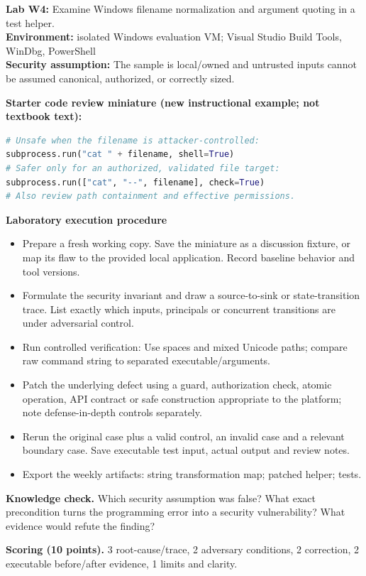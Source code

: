 \documentclass[10pt,letterpaper]{article}
\begin{document}
\begin{insight}\textbf{Lab W4:} Examine Windows filename normalization and argument quoting in a test helper.\\\textbf{Environment:} isolated Windows evaluation VM; Visual Studio Build Tools, WinDbg, PowerShell\\\textbf{Security assumption:} The sample is local/owned and untrusted inputs cannot be assumed canonical, authorized, or correctly sized.\end{insight}
\textbf{Starter code review miniature (new instructional example; not textbook text):}
\begin{lstlisting}[language=Python]
# Unsafe when the filename is attacker-controlled:
subprocess.run("cat " + filename, shell=True)
# Safer only for an authorized, validated file target:
subprocess.run(["cat", "--", filename], check=True)
# Also review path containment and effective permissions.
\end{lstlisting}
\textbf{Laboratory execution procedure}
\begin{itemize}[leftmargin=*,itemsep=2pt]
\item Prepare a fresh working copy. Save the miniature as a discussion fixture, or map its flaw to the provided local application. Record baseline behavior and tool versions.
\item Formulate the security invariant and draw a source-to-sink or state-transition trace. List exactly which inputs, principals or concurrent transitions are under adversarial control.
\item Run controlled verification: Use spaces and mixed Unicode paths; compare raw command string to separated executable/arguments.
\item Patch the underlying defect using a guard, authorization check, atomic operation, API contract or safe construction appropriate to the platform; note defense-in-depth controls separately.
\item Rerun the original case plus a valid control, an invalid case and a relevant boundary case. Save executable test input, actual output and review notes.
\item Export the weekly artifacts: string transformation map; patched helper; tests.
\end{itemize}
\textbf{Knowledge check.} Which security assumption was false? What exact precondition turns the programming error into a security vulnerability? What evidence would refute the finding?

\textbf{Scoring (10 points).} 3 root-cause/trace, 2 adversary conditions, 2 correction, 2 executable before/after evidence, 1 limits and clarity.
\end{document}

